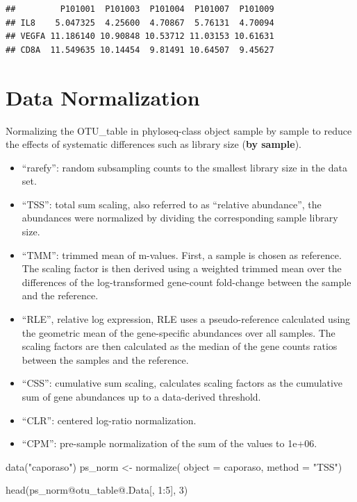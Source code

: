 \documentclass[
]{book}
\newenvironment{Shaded}{\begin{snugshade}}{\end{snugshade}}
\newcommand{\AttributeTok}[1]{\textcolor[rgb]{0.77,0.63,0.00}{#1}}
\newcommand{\DecValTok}[1]{\textcolor[rgb]{0.00,0.00,0.81}{#1}}
\newcommand{\FunctionTok}[1]{\textcolor[rgb]{0.00,0.00,0.00}{#1}}
\newcommand{\NormalTok}[1]{#1}
\newcommand{\OtherTok}[1]{\textcolor[rgb]{0.56,0.35,0.01}{#1}}
\newcommand{\SpecialCharTok}[1]{\textcolor[rgb]{0.00,0.00,0.00}{#1}}
\newcommand{\StringTok}[1]{\textcolor[rgb]{0.31,0.60,0.02}{#1}}
\begin{document}
\begin{verbatim}
##         P101001  P101003  P101004  P101007  P101009
## IL8    5.047325  4.25600  4.70867  5.76131  4.70094
## VEGFA 11.186140 10.90848 10.53712 11.03153 10.61631
## CD8A  11.549635 10.14454  9.81491 10.64507  9.45627
\end{verbatim}

\hypertarget{data-normalization}{%
\section{Data Normalization}\label{data-normalization}}

Normalizing the OTU\_table in phyloseq-class object sample by sample to reduce the effects of systematic differences such as library size (\textbf{by sample}).

\begin{itemize}
\item
  ``rarefy'': random subsampling counts to the smallest library size in the data set.
\item
  ``TSS'': total sum scaling, also referred to as ``relative abundance'', the abundances were normalized by dividing the corresponding sample library size.
\item
  ``TMM'': trimmed mean of m-values. First, a sample is chosen as reference. The scaling factor is then derived using a weighted trimmed mean over the differences of the log-transformed gene-count fold-change between the sample and the reference.
\item
  ``RLE'', relative log expression, RLE uses a pseudo-reference calculated using the geometric mean of the gene-specific abundances over all samples. The scaling factors are then calculated as the median of the gene counts ratios between the samples and the reference.
\item
  ``CSS'': cumulative sum scaling, calculates scaling factors as the cumulative sum of gene abundances up to a data-derived threshold.
\item
  ``CLR'': centered log-ratio normalization.
\item
  ``CPM'': pre-sample normalization of the sum of the values to 1e+06.
\end{itemize}

\begin{Shaded}
\begin{Highlighting}[]
\FunctionTok{data}\NormalTok{(}\StringTok{"caporaso"}\NormalTok{)}
\NormalTok{ps\_norm }\OtherTok{\textless{}{-}} \FunctionTok{normalize}\NormalTok{(}
    \AttributeTok{object =}\NormalTok{ caporaso,}
    \AttributeTok{method =} \StringTok{"TSS"}\NormalTok{)}

\FunctionTok{head}\NormalTok{(ps\_norm}\SpecialCharTok{@}\NormalTok{otu\_table}\SpecialCharTok{@}\NormalTok{.Data[, }\DecValTok{1}\SpecialCharTok{:}\DecValTok{5}\NormalTok{], }\DecValTok{3}\NormalTok{)}
\end{Highlighting}
\end{Shaded}
\end{document}
